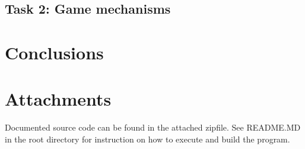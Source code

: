 \documentclass[a4paper, 11pt]{article}
\begin{document}
\subsection*{Task 2: Game mechanisms}

\section*{Conclusions}


\section*{Attachments}
Documented source code can be found in the attached zipfile. See README.MD in the root directory for instruction on how to execute and build the program.

{}

\end{document}
